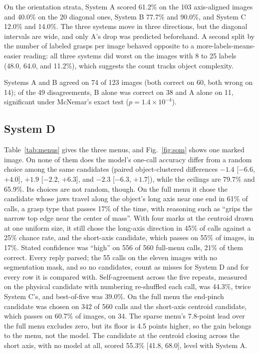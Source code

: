 \documentclass[10pt,conference]{IEEEtran}
\begin{document}
On the orientation strata, System A scored 61.2\% on the 103 axis-aligned
images and 40.0\% on the 20 diagonal ones, System B 77.7\% and 90.0\%,
and System C 12.0\% and 14.0\%. The three systems move in three
directions, but the diagonal intervals are wide, and only A's drop was
predicted beforehand. A second split by the number of labeled grasps per
image behaved opposite to a more-labels-means-easier reading: all three
systems did worst on the images with 8 to 25 labels (48.0, 64.0, and
11.2\%), which suggests the count tracks object complexity.

Systems A and B agreed on 74 of 123 images (both correct on 60, both wrong
on 14); of the 49 disagreements, B alone was correct on 38 and A alone on
11, significant under McNemar's exact test ($p=1.4\times10^{-4}$).

\subsection{System D}

Table~\ref{tab:menus} gives the three menus, and Fig.~\ref{fig:som}
shows one marked image. On none of them does the
model's one-call accuracy differ from a random choice among the same
candidates (paired object-clustered differences $-1.4$ [$-6.6$, $+4.0$],
$+1.9$ [$-2.2$, $+6.3$], and $-2.3$ [$-6.3$, $+1.7$]), while the ceilings
are 79.7\% and 65.9\%. Its choices are not random, though. On the full
menu it chose the candidate whose jaws travel along the object's long axis
near one end in 61\% of calls, a grasp type that passes 17\% of the time,
with reasoning such as ``grips the narrow top edge near the center of
mass''. With four marks at the centroid drawn at one uniform size, it still
chose the long-axis direction in 45\% of calls against a 25\% chance rate,
and the short-axis candidate, which passes on 55\% of images, in 17\%.
Stated confidence was ``high'' on 556 of 560 full-menu calls, 21\% of them
correct. Every reply parsed; the 55 calls on the eleven images with no
segmentation mask, and so no candidates, count as misses for System D and
for every row it is compared with. Self-agreement across the five repeats,
measured on the physical candidate with numbering re-shuffled each call,
was 44.3\%, twice System C's, and best-of-five was 39.0\%. On the full
menu the end-pinch candidate was chosen on 342 of 560 calls and the
short-axis centroid candidate, which passes on 60.7\% of images, on 34.
The sparse menu's 7.8-point lead over the full menu excludes zero, but its
floor is 4.5 points higher, so the gain belongs to the menu, not the model. The candidate at the centroid closing across
the short axis, with no model at all, scored 55.3\% [41.8, 68.0], level
with System A.
\end{document}
